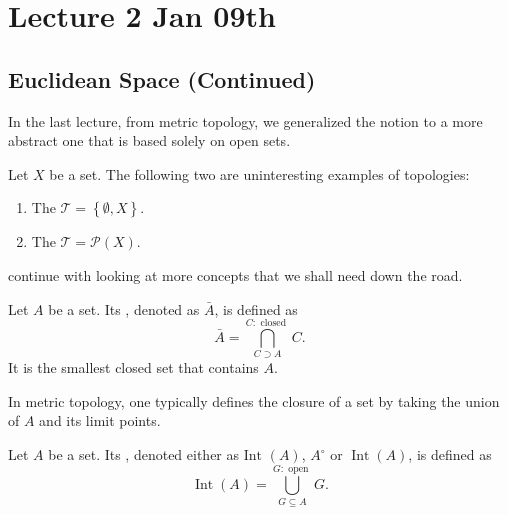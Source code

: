 \documentclass[notoc,notitlepage]{tufte-book}
\DeclareMathOperator{\Int}{Int}
\begin{document}


\chapter{Lecture 2 Jan 09th}%
\label{chp:lecture_2_jan_09th}

\section{Euclidean Space (Continued)}%
\label{sec:euclidean_space_continued}

In the last lecture, from metric topology, we generalized the notion to a more abstract one
that is based solely on open sets.

\begin{eg}
  Let $X$ be a set. The following two are
  uninteresting examples of topologies:
  \begin{enumerate}
    \item The  $\mathcal{T} = \left\{ \emptyset, X \right\}$.
    \item The  $\mathcal{T} = \mathcal{P}(X)$.
  \end{enumerate}
\end{eg}

 continue with looking at
more concepts that we shall need down the road.

\begin{defn}\label{defn:closure_of_a_set}
  Let $A$ be a set. Its ,
  denoted as $\bar{A}$, is defined as
  \begin{equation*}
    \bar{A} = \bigcap_{C \supset A}^{C: \text{ closed }} C.
  \end{equation*}
  It is the smallest closed set that contains $A$.
\end{defn}

\begin{note}
  In metric topology, one typically defines the closure of a set by taking the union of $A$ and its limit points.
\end{note}

\begin{defn}\label{defn:interior_of_a_set}
  Let $A$ be a set. Its ,
  denoted either as $\text{Int }(A)$, $A^\circ$ or $\Int(A)$,
  is defined as
  \begin{equation*}
    \Int(A) = \bigcup_{G \subseteq A}^{G: \text{ open }} G.
  \end{equation*}
\end{defn}
\end{document}
